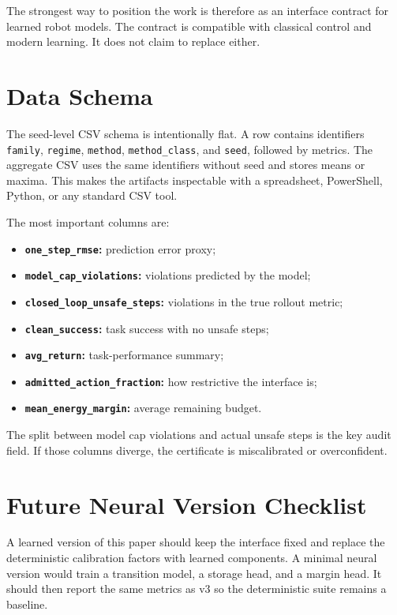 \documentclass{article}
\begin{document}
The strongest way to position the work is therefore as an interface contract for learned robot models. The contract is compatible with classical control and modern learning. It does not claim to replace either.

\section{Data Schema}

The seed-level CSV schema is intentionally flat. A row contains identifiers \texttt{family}, \texttt{regime}, \texttt{method}, \texttt{method\_class}, and \texttt{seed}, followed by metrics. The aggregate CSV uses the same identifiers without seed and stores means or maxima. This makes the artifacts inspectable with a spreadsheet, PowerShell, Python, or any standard CSV tool.

The most important columns are:
\begin{itemize}
    \item \textbf{\texttt{one\_step\_rmse}:} prediction error proxy;
    \item \textbf{\texttt{model\_cap\_violations}:} violations predicted by the model;
    \item \textbf{\texttt{closed\_loop\_unsafe\_steps}:} violations in the true rollout metric;
    \item \textbf{\texttt{clean\_success}:} task success with no unsafe steps;
    \item \textbf{\texttt{avg\_return}:} task-performance summary;
    \item \textbf{\texttt{admitted\_action\_fraction}:} how restrictive the interface is;
    \item \textbf{\texttt{mean\_energy\_margin}:} average remaining budget.
\end{itemize}
The split between model cap violations and actual unsafe steps is the key audit field. If those columns diverge, the certificate is miscalibrated or overconfident.

\clearpage
\section{Future Neural Version Checklist}

A learned version of this paper should keep the interface fixed and replace the deterministic calibration factors with learned components. A minimal neural version would train a transition model, a storage head, and a margin head. It should then report the same metrics as v3 so the deterministic suite remains a baseline.
\end{document}

